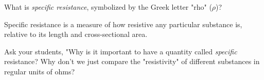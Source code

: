 

What is {\it specific resistance}, symbolized by the Greek letter "rho" ($\rho$)?







Specific resistance is a measure of how resistive any particular substance is, relative to its length and cross-sectional area.







Ask your students, "Why is it important to have a quantity called {\it specific} resistance?  Why don't we just compare the "resistivity" of different substances in regular units of ohms?




